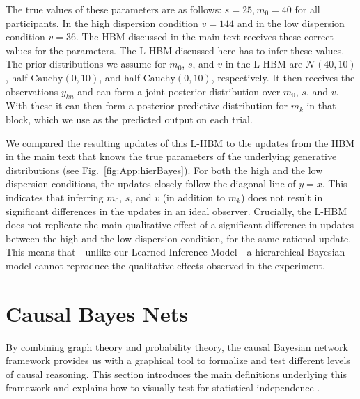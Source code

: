 The true values of these parameters are as follows: $s = 25, m_0 = 40$ for all participants. In the high dispersion condition $v = 144$ and in the low dispersion condition $v = 36$.  The HBM discussed in the main text receives these correct values for the parameters. The L-HBM discussed here has to infer these values. The prior distributions we assume for $m_0$, $s$, and $v$ in the L-HBM are $\mathcal{N}(40,10)$, half-$\mathrm{Cauchy}(0,10)$, and half-$\mathrm{Cauchy}(0,10)$, respectively. It then receives the observations $y_{kn}$ and can form a joint posterior distribution over $m_0$, $s$, and $v$. With these it can then form a posterior predictive distribution for $m_k$ in that block, which we use as the predicted output on each trial.


We compared the resulting updates of this L-HBM to the updates from the HBM in the main text that knows the true parameters of the underlying generative distributions (see Fig.~\ref{fig:App:hierBayes}). For both the high and the low dispersion conditions, the updates closely follow the diagonal line of $y=x$. This indicates that inferring $m_0$, $s$, and $v$ (in addition to $m_k$) does not result in significant differences in the updates in an ideal observer. Crucially, the L-HBM does not replicate the main qualitative effect of a significant difference in updates between the high and the low dispersion condition, for the same rational update. This means that---unlike our Learned Inference Model---a hierarchical Bayesian model cannot reproduce the qualitative effects observed in the experiment.

\newpage

\section{Causal Bayes Nets}
\label{app:causal_cbn}

By combining graph theory and probability theory, the causal Bayesian network framework provides us with a graphical tool to formalize and test different levels of causal reasoning. This section introduces the main definitions underlying this framework and explains how to visually test for statistical independence  \citep{pearl88probabilistic,bishop06pattern,kollerl09probabilistic,barber12bayesian,murphy12machine}.


